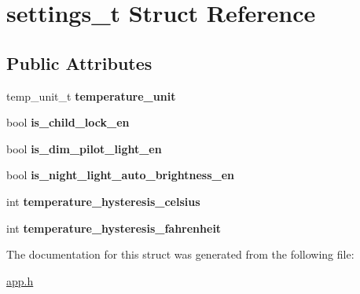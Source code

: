 \hypertarget{structsettings__t}{}\section{settings\+\_\+t Struct Reference}
\label{structsettings__t}
\subsection*{Public Attributes}
\begin{DoxyCompactItemize}
\item 
temp\+\_\+unit\+\_\+t {\bfseries temperature\+\_\+unit}\hypertarget{structsettings__t_aab877598096097a8b81ce10b1f3f39b7}{}\label{structsettings__t_aab877598096097a8b81ce10b1f3f39b7}

\item 
bool {\bfseries is\+\_\+child\+\_\+lock\+\_\+en}\hypertarget{structsettings__t_ac855d8fcc14f9da9d8228f28c3040461}{}\label{structsettings__t_ac855d8fcc14f9da9d8228f28c3040461}

\item 
bool {\bfseries is\+\_\+dim\+\_\+pilot\+\_\+light\+\_\+en}\hypertarget{structsettings__t_a2fa2c14431ea58c6ce6c506f05f3c909}{}\label{structsettings__t_a2fa2c14431ea58c6ce6c506f05f3c909}

\item 
bool {\bfseries is\+\_\+night\+\_\+light\+\_\+auto\+\_\+brightness\+\_\+en}\hypertarget{structsettings__t_a3fcf84fba1e12c13fdbc4c6389bf0b90}{}\label{structsettings__t_a3fcf84fba1e12c13fdbc4c6389bf0b90}

\item 
int {\bfseries temperature\+\_\+hysteresis\+\_\+celsius}\hypertarget{structsettings__t_ae3c29b9e8458a10b680e0787bf4556f4}{}\label{structsettings__t_ae3c29b9e8458a10b680e0787bf4556f4}

\item 
int {\bfseries temperature\+\_\+hysteresis\+\_\+fahrenheit}\hypertarget{structsettings__t_a7fd32eb94e49a376197801367196f2f9}{}\label{structsettings__t_a7fd32eb94e49a376197801367196f2f9}

\end{DoxyCompactItemize}


The documentation for this struct was generated from the following file\+:\begin{DoxyCompactItemize}
\item 
\hyperlink{app_8h}{app.\+h}\end{DoxyCompactItemize}
